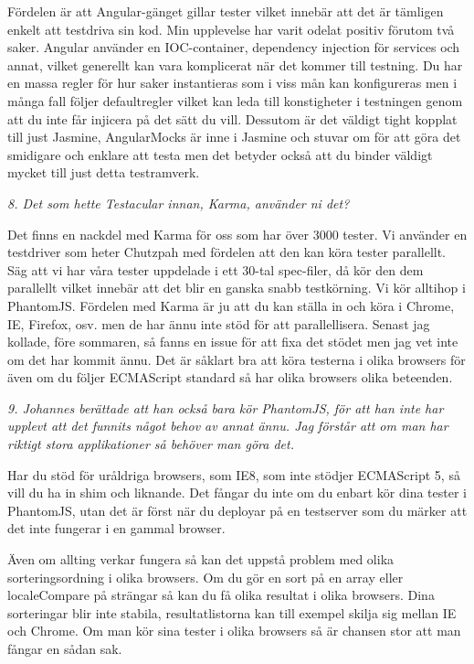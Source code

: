 \documentclass[11pt]{article}
\begin{document}
Fördelen är att Angular-gänget gillar tester vilket innebär att det är tämligen enkelt att testdriva sin kod. Min upplevelse har varit odelat positiv förutom två saker. Angular använder en IOC-container, dependency injection för services och annat, vilket generellt kan vara komplicerat när det kommer till testning. Du har en massa regler för hur saker instantieras som i viss mån kan konfigureras men i många fall följer defaultregler vilket kan leda till konstigheter i testningen genom att du inte får injicera på det sätt du vill. Dessutom är det väldigt tight kopplat till just Jasmine, AngularMocks är inne i Jasmine och stuvar om för att göra det smidigare och enklare att testa men det betyder också att du binder väldigt mycket till just detta testramverk.

\emph{8. Det som hette Testacular innan, Karma, använder ni det?}

Det finns en nackdel med Karma för oss som har över 3000 tester. Vi använder en testdriver som heter Chutzpah med fördelen att den kan köra tester parallellt. Säg att vi har våra tester uppdelade i ett 30-tal spec-filer, då kör den dem parallellt vilket innebär att det blir en ganska snabb testkörning. Vi kör alltihop i PhantomJS. Fördelen med Karma är ju att du kan ställa in och köra i Chrome, IE, Firefox, osv. men de har ännu inte stöd för att parallellisera. Senast jag kollade, före sommaren, så fanns en issue för att fixa det stödet men jag vet inte om det har kommit ännu. Det är såklart bra att köra testerna i olika browsers för även om du följer ECMAScript standard så har olika browsers olika beteenden.

\emph{9. Johannes berättade att han också bara kör PhantomJS, för att han inte har upplevt att det funnits något behov av annat ännu. Jag förstår att om man har riktigt stora applikationer så behöver man göra det.}

Har du stöd för uråldriga browsers, som IE8, som inte stödjer ECMAScript 5, så vill du ha in shim och liknande. Det fångar du inte om du enbart kör dina tester i PhantomJS, utan det är först när du deployar på en testserver som du märker att det inte fungerar i en gammal browser.

Även om allting verkar fungera så kan det uppstå problem med olika sorteringsordning i olika browsers. Om du gör en sort på en array eller localeCompare på strängar så kan du få olika resultat i olika browsers. Dina sorteringar blir inte stabila, resultatlistorna kan till exempel skilja sig mellan IE och Chrome. Om man kör sina tester i olika browsers så är chansen stor att man fångar en sådan sak.
\end{document}
